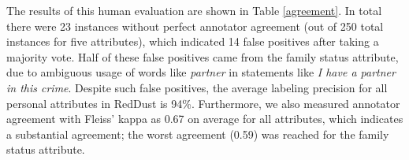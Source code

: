 The results of this human evaluation are shown in Table \ref{agreement}. In total there were 23 instances without perfect annotator agreement (out of 250 total instances for five attributes), which indicated 14 false positives after taking a majority vote. Half of these false positives came from the family status attribute, due to ambiguous usage of words like 
\emph{partner} in statements like \emph{I have a partner in this crime}.
Despite such false positives, 
the average labeling precision for all personal attributes in RedDust is 94\%.
Furthermore, we also measured annotator agreement with Fleiss' kappa as 0.67 on average for all attributes, which indicates a substantial agreement; the worst agreement (0.59) was reached for the family status attribute.